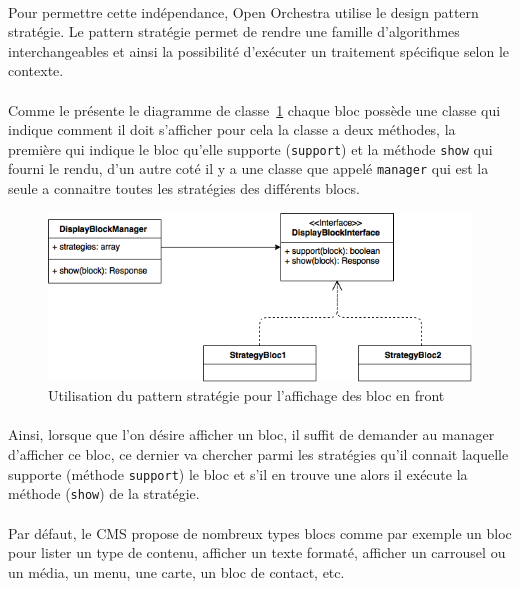 	       \paragraph{}
	       Pour permettre cette indépendance, Open Orchestra utilise le design pattern stratégie. Le pattern stratégie permet de rendre une famille d'algorithmes interchangeables et ainsi  la possibilité d'exécuter un traitement spécifique selon le contexte.

          \paragraph{}
	       Comme le présente le diagramme de classe~\ref{pattern strategy} chaque bloc possède une classe qui indique comment il doit s'afficher pour cela la classe a deux méthodes, la première qui indique le bloc qu'elle supporte (\verb?support?) et la méthode \verb?show? qui fourni le rendu, d'un autre coté il y a une classe que appelé \verb?manager?  qui est la seule a connaitre toutes les stratégies des différents blocs. 
		\begin{figure}[H]
        \begin{center}
          \includegraphics[scale=0.75]{images/strategy_block}
        \end{center}
        \caption{Utilisation du pattern stratégie pour l'affichage des bloc en front}
        \label{pattern strategy}
      \end{figure}
         \paragraph{}
	       Ainsi, lorsque que l'on désire afficher un bloc, il suffit de demander au manager d'afficher ce bloc, ce dernier va chercher parmi les stratégies qu'il connait laquelle supporte (méthode \verb?support?) le bloc et s'il en trouve une alors il exécute la méthode (\verb?show?) de la stratégie.
	        
	      	\paragraph{}
	      	Par défaut, le CMS propose de nombreux types blocs  comme par exemple un bloc pour lister un type de contenu, afficher un texte formaté, afficher un carrousel ou un média, un menu, une carte, un bloc de contact, etc.

